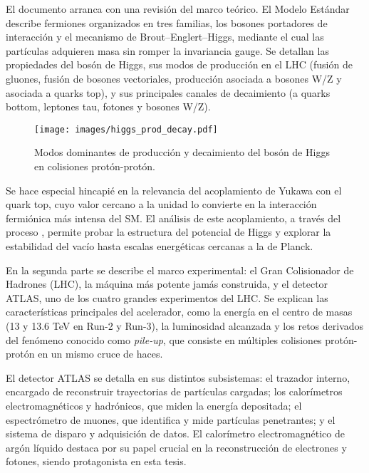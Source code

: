 El documento arranca con una revisión del marco teórico. El Modelo Estándar describe fermiones organizados en tres
familias, los bosones portadores de interacción y el mecanismo de Brout--Englert--Higgs, mediante el cual las
partículas adquieren masa sin romper la invariancia gauge. Se detallan las propiedades del bosón de Higgs, sus modos
de producción en el LHC (fusión de gluones, fusión de bosones vectoriales, producción asociada a bosones W/Z y
asociada a quarks top), y sus principales canales de decaimiento (a quarks bottom, leptones tau, fotones y bosones W/Z).

\begin{figure}[htbp]
  \centering
  \texttt{[image: images/higgs\_prod\_decay.pdf]}
  \caption{Modos dominantes de producción y decaimiento del bosón de Higgs en colisiones protón-protón.}
  \label{fig:higgs_resumen}
\end{figure}

Se hace especial hincapié en la relevancia del acoplamiento de Yukawa con el quark top, cuyo valor cercano a la
unidad lo convierte en la interacción fermiónica más intensa del SM. El análisis de este acoplamiento, a través del
proceso \ttH, permite probar la estructura del potencial de Higgs y explorar la estabilidad del vacío hasta escalas
energéticas cercanas a la de Planck.

En la segunda parte se describe el marco experimental: el Gran Colisionador de Hadrones (LHC), la máquina más
potente jamás construida, y el detector ATLAS, uno de los cuatro grandes experimentos del LHC. Se explican las
características principales del acelerador, como la energía en el centro de masas (13 y 13.6 TeV en Run-2 y Run-3),
la luminosidad alcanzada y los retos derivados del fenómeno conocido como \textit{pile-up}, que consiste en múltiples
colisiones protón-protón en un mismo cruce de haces.

El detector ATLAS se detalla en sus distintos subsistemas: el trazador interno, encargado de reconstruir trayectorias
de partículas cargadas; los calorímetros electromagnéticos y hadrónicos, que miden la energía depositada; el
espectrómetro de muones, que identifica y mide partículas penetrantes; y el sistema de disparo y adquisición de
datos. El calorímetro electromagnético de argón líquido destaca por su papel crucial en la reconstrucción de
electrones y fotones, siendo protagonista en esta tesis.

